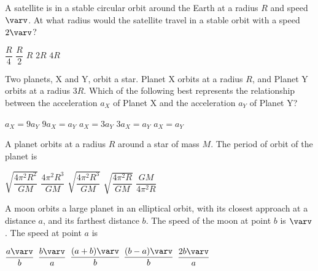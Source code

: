 \documentclass{../../oss-apphys-exam}
\begin{document}
\begin{questions}
\begin{multicols*}{2}
    \question A satellite is in a stable circular orbit around the Earth at a
    radius $R$ and speed $\varv$. At what radius would the satellite travel in
    a stable orbit with a speed $2\varv$?
    \begin{choices}
      \choice $\dfrac R4$
      \choice $\dfrac R2$
      \choice $R$
      \choice $2R$
      \choice $4R$
    \end{choices}
    
    \question Two planets, X and Y, orbit a star. Planet X orbits at a radius
    $R$, and Planet Y orbits at a radius $3R$. Which of the following best
    represents the relationship between the acceleration $a_X$ of Planet X and
    the acceleration $a_Y$ of Planet Y?
    \begin{center}
    \end{center}
    \begin{choices}
      \choice $a_X = 9a_Y$
      \choice $9a_X = a_Y$
      \choice $a_X = 3a_Y$
      \choice $3a_X = a_Y$
      \choice $a_X = a_Y$
    \end{choices}
    
    \question A planet orbits at a radius $R$ around a star of mass $M$. The
    period of orbit of the planet is
    \begin{choices}
      \choice $\sqrt{\dfrac{4\pi^2R^2}{GM}}$
      \choice $\dfrac{4\pi^2R^3}{GM}$
      \choice $\sqrt{\dfrac{4\pi^2R^3}{GM}}$
      \choice $\sqrt{\dfrac{4\pi^2R}{GM}}$
      \choice $\dfrac{GM}{4\pi^2R}$
    \end{choices}

    \question A moon orbits a large planet in an elliptical orbit, with its
    closest approach at a distance $a$, and its farthest distance $b$. The
    speed of the moon at point $b$ is $\varv$. The speed at point $a$ is
    \begin{choices}
      \choice $\dfrac{a\varv}b$
      \choice $\dfrac{b\varv}a$
      \choice $\dfrac{(a+b)\varv}b$
      \choice $\dfrac{(b-a)\varv}b$
      \choice $\dfrac{2b\varv}a$
    \end{choices}


\end{multicols*}
\end{questions}
\end{document}
